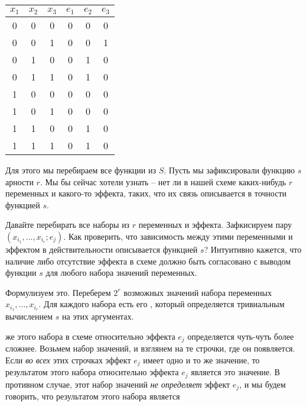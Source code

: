 \begin{framed}
	\begin{tabular}{c|c|c|c|c|c}
		$x_1$ & $x_2$ & $x_3$ & $e_1$ & $e_2$ & $e_3$ \\
		\hline
		0     & 0     & 0     &     0 & 0     & 0     \\
		0     & 0     & 1     &     0 & 0     & 1     \\
		0     & 1     & 0     &     0 & 1     & 0     \\
		0     & 1     & 1     &     0 & 1     & 0     \\
		1     & 0     & 0     &     0 & 0     & 0     \\
		1     & 0     & 1     &     0 & 0     & 0     \\
		1     & 1     & 0     &     0 & 1     & 0     \\
		1     & 1     & 1     &     0 & 1     & 0     \\
	\end{tabular}
\end{framed}

Для этого мы перебираем все функции из $S$. Пусть мы зафиксировали функцию $s$ арности $r$. Мы бы сейчас хотели узнать -- нет ли в нашей схеме каких-нибудь $r$ переменных и какого-то эффекта, таких, что их связь описывается в точности функцией $s$. 

Давайте перебирать все наборы из $r$ переменных и эффекта. Зафкисируем пару $(x_{i_1}, \ldots, x_{i_r}; e_j)$. Как проверить, что зависимость между этими переменными и эффектом в действительности описывается функцией $s$? Интуитивно кажется, что наличие либо отсутствие эффекта в схеме должно быть согласовано с выводом функции $s$ для любого набора значений переменных. 

Формулизуем это. Переберем $2^r$ возможных значений набора переменных $x_{i_1}, \ldots, x_{i_r}$. Для каждого набора есть его , который определяется тривиальным вычислением $s$ на этих аргументах. 

 же этого набора {в схеме относительно эффекта} $e_j$ определяется чуть-чуть более сложнее. Возьмем набор значений, и взглянем на те строчки, где он появляется. Если \emph{во всех} этих строчках эффект $e_j$ имеет одно и то же значение, то результатом этого набора относительно эффекта $e_j$ является это значение. В противном случае, этот набор значений \emph{не определяет} эффект $e_j$, и мы будем говорить, что результатом этого набора является 

